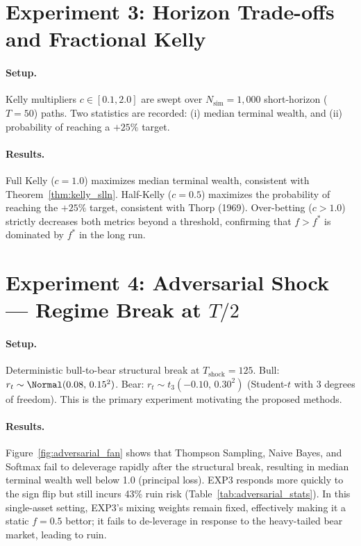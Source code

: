 \section{Experiment 3: Horizon Trade-offs and Fractional Kelly}
\label{sec:exp3}

\paragraph{Setup.}
Kelly multipliers $c\in[0.1, 2.0]$ are swept over $N_{\text{sim}}=1{,}000$
short-horizon ($T=50$) paths.  Two statistics are recorded: (i) median
terminal wealth, and (ii) probability of reaching a $+25\%$ target.

\paragraph{Results.}
Full Kelly ($c=1.0$) maximizes median terminal wealth, consistent with
Theorem~\ref{thm:kelly_slln}.  Half-Kelly ($c=0.5$) maximizes the probability
of reaching the $+25\%$ target, consistent with Thorp (1969).  Over-betting
($c>1.0$) strictly decreases both metrics beyond a threshold, confirming that
$f > f^*$ is dominated by $f^*$ in the long run.

\section{Experiment 4: Adversarial Shock --- Regime Break at $T/2$}
\label{sec:exp4}

\paragraph{Setup.}
Deterministic bull-to-bear structural break at $T_{\text{shock}}=125$.
Bull: $r_t\sim\Normal(0.08,\,0.15^2)$.
Bear: $r_t\sim t_3(-0.10,\,0.30^2)$ (Student-$t$ with 3 degrees of freedom).
This is the primary experiment motivating the proposed methods.

\paragraph{Results.}
Figure~\ref{fig:adversarial_fan} shows that Thompson Sampling, Naive Bayes,
and Softmax fail to deleverage rapidly after the structural break, resulting
in median terminal wealth well below 1.0 (principal loss).  EXP3 responds
more quickly to the sign flip but still incurs 43\% ruin risk (Table~\ref{tab:adversarial_stats}). In this single-asset setting, EXP3's mixing weights remain fixed, effectively making it a static $f=0.5$ bettor; it fails to de-leverage in response to the heavy-tailed bear market, leading to ruin.

